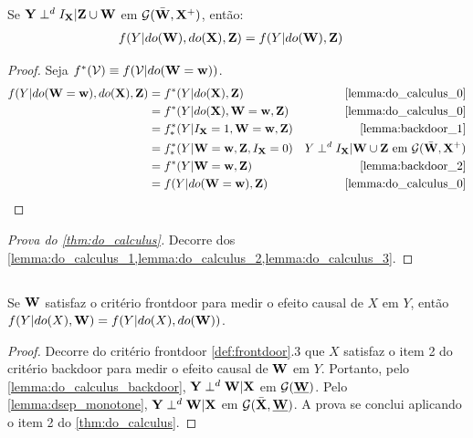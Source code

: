 \begin{lemma}
 \label{lemma:do_calculus_3}
 Se ${\mathbf{Y}} \perp^d I_{{\mathbf{X}}} | {\mathbf{Z}} \cup {\mathbf{W}}$ em ${\mathcal G}(\bar{{\mathbf{W}}}, {\mathbf{X}}^{+})$, então:
 \begin{align*}
  f(Y|do({\mathbf{W}}), do({\mathbf{X}}), {\mathbf{Z}}) &= f(Y|do({\mathbf{W}}), {\mathbf{Z}})
 \end{align*}
\end{lemma}

\begin{proof}
 Seja $f^*({\mathcal V}) \equiv f({\mathcal V}|do({\mathbf{W}}={\mathbf{w}}))$.
 \begin{align*}
  f(Y|do(\W=\w), do(\X), \Z)
  &= f^*(Y|do(\X),\Z) 
  & \text{\cref{lemma:do_calculus_0}} \\
  &= f^*(Y|do(\X),\W=\w,\Z)
  & \text{\cref{lemma:do_calculus_0}} \\ 
  &= f^*_*(Y|I_{\X} = 1, \W=\w, \Z)
  & \text{\cref{lemma:backdoor_1}} \\
  &= f^*_*(Y|\W=\w, \Z, I_{\X}=0)
  & Y \dsep I_{\X} | \W \cup \Z
  \text{ em } \sG(\bar{\W}, \X^{+}) \\
  &= f^*(Y|\W=\w, \Z) 
  & \text{\cref{lemma:backdoor_2}} \\
  &= f(Y|do(\W=\w), \Z)
  & \text{\cref{lemma:do_calculus_0}}
 \end{align*}
\end{proof}

\begin{proof}[Prova do \cref{thm:do_calculus}]
 Decorre dos 
 \cref{lemma:do_calculus_1,lemma:do_calculus_2,lemma:do_calculus_3}.
\end{proof}

\subsection{}

\begin{lemma}
 \label{lemma:frontdoor_1}
 Se ${\mathbf{W}}$ satisfaz o critério frontdoor para
 medir o efeito causal de $X$ em $Y$, então
 $f(Y|do(X),{\mathbf{W}}) = f(Y|do(X),do({\mathbf{W}}))$.
\end{lemma}

\begin{proof}
 Decorre do critério frontdoor \cref{def:frontdoor}.3 que
 $X$ satisfaz o item 2 do critério backdoor para
 medir o efeito causal de ${\mathbf{W}}$ em $Y$.
 Portanto, pelo \cref{lemma:do_calculus_backdoor},
 ${\mathbf{Y}} \perp^d {\mathbf{W}} | {\mathbf{X}}$ em ${\mathcal G}(\underline{{\mathbf{W}}})$.
 Pelo \cref{lemma:dsep_monotone},
 ${\mathbf{Y}} \perp^d {\mathbf{W}} | {\mathbf{X}}$ em ${\mathcal G}(\bar{{\mathbf{X}}}, \underline{{\mathbf{W}}})$.
 A prova se conclui aplicando o item 2
 do \cref{thm:do_calculus}.
\end{proof}

